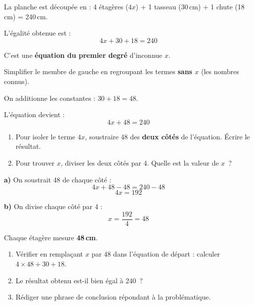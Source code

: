 \documentclass[a4paper,11pt]{article}
\begin{document}
\begin{correction}
La planche est découpée en : 4 étagères ($4x$) + 1 tasseau (30\,cm) + 1 chute (18\,cm) = 240\,cm.

\medskip
L'égalité obtenue est :
\[ 4x + 30 + 18 = 240 \]

C'est une \textbf{équation du premier degré} d'inconnue $x$.
\end{correction}

\vspace{6pt}

\begin{question}
Simplifier le membre de gauche en regroupant les termes \textbf{sans $x$} (les nombres connus).
\end{question}

\begin{correction}
On additionne les constantes : $30 + 18 = 48$.

L'équation devient :
\[ 4x + 48 = 240 \]
\end{correction}

\vspace{6pt}

\begin{question}
\begin{enumerate}[label=\alph*)]
  \item Pour isoler le terme $4x$, soustraire 48 des \textbf{deux côtés} de l'équation. Écrire le résultat.
  \item Pour trouver $x$, diviser les deux côtés par 4. Quelle est la valeur de $x$~?
\end{enumerate}
\end{question}

\begin{correction}
\textbf{a)} On soustrait 48 de chaque côté :
\[ 4x + 48 - 48 = 240 - 48 \]
\[ 4x = 192 \]

\textbf{b)} On divise chaque côté par 4 :
\[ x = \frac{192}{4} = 48 \]

Chaque étagère mesure \textbf{48\,cm}.
\end{correction}

\vspace{6pt}

\begin{question}
\begin{enumerate}[label=\alph*)]
  \item Vérifier en remplaçant $x$ par 48 dans l'équation de départ : calculer $4 \times 48 + 30 + 18$.
  \item Le résultat obtenu est-il bien égal à 240~?
  \item Rédiger une phrase de conclusion répondant à la problématique.
\end{enumerate}
\end{question}
\end{document}
